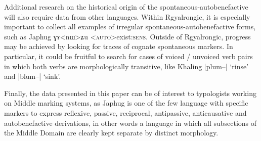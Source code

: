 \documentclass[oldfontcommands,oneside,a4paper,11pt]{article}
\newcommand{\ipa}[1]{{\phon \mbox{#1}}} %
\begin{document}
Additional research on the historical origin of the spontaneous-autobenefactive will also require data from other languages. Within Rgyalrongic, it is especially important to collect all examples of irregular spontaneous-autobenefactive forms, such as Japhug \ipa{ɣɤ<nɯ>ʑu} <\textsc{auto}>exist:\textsc{sens}. Outside of Rgyalrongic, progress may be achieved by looking for traces of cognate spontaneous markers. In particular, it could be fruitful to search for cases of voiced / unvoiced verb pairs in which both verbs are morphologically transitive, like Khaling |\ipa{plum--}| `rinse' and |\ipa{blum--}| `sink'.

Finally, the data presented in this paper can be of interest to typologists working on Middle marking systems, as Japhug is one of the few language with specific markers to express reflexive, passive, reciprocal, antipassive, anticausative and autobenefactive derivations, in other words a language in which all subsections of the Middle Domain are clearly kept separate by distinct morphology.




 
\end{document}
